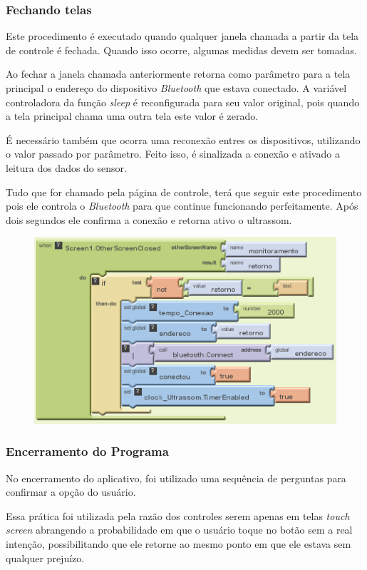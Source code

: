 \documentclass[portugues, brazil, a4paper,12pt]{article}
\begin{document}
\subsubsection{Fechando telas}
Este procedimento é executado quando qualquer janela chamada a partir da tela de controle é fechada. Quando isso ocorre, algumas medidas devem ser tomadas.

Ao fechar a janela chamada anteriormente retorna como parâmetro para a tela principal o endereço do dispositivo \textit{Bluetooth} que estava conectado. A variável controladora da função \textit{sleep} é reconfigurada para seu valor original, pois quando a tela principal chama uma outra tela este valor é zerado.

É necessário também que ocorra uma reconexão entres os dispositivos, utilizando o valor passado por parâmetro. Feito isso, é sinalizada a conexão e ativado a leitura dos dados do sensor.

Tudo que for chamado pela página de controle, terá que seguir este procedimento pois ele controla o \textit{Bluetooth} para que continue funcionando perfeitamente. Após dois segundos ele confirma a conexão e retorna ativo o ultrassom.


\begin{figure}[H]
	\centering
	\includegraphics[scale=.8]{img/controle/fotherscreen.png}
	
\end{figure}


\subsubsection{Encerramento do Programa}

No encerramento do aplicativo, foi utilizado uma sequência de perguntas para confirmar a opção do usuário. 

Essa prática foi utilizada pela razão dos controles serem apenas em telas \textit{touch screen} abrangendo a probabilidade em que o usuário toque no botão sem a real intenção, possibilitando que ele retorne ao mesmo ponto em que ele estava sem qualquer prejuízo.
\end{document}
